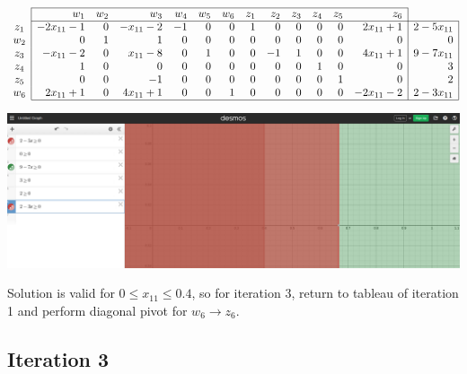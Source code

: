\documentclass[12pt]{article}
\begin{document}
$\begin{array}{c|rrrrrrrrrrrr|r|}
\cline{2-13}
& w_1 & w_2 & w_3 & w_4 & w_5 & w_6 & z_1 & z_2 & z_3 & z_4 & z_5 & z_6 \\
\cline{2-14}
z_1 & - 2 x_{11} - 1 & 0 & - x_{11} - 2 & -1 & 0 & 0 & 1 & 0 & 0 & 0 & 0 & 2 x_{11} + 1 & 2 - 5 x_{11} \\
w_2 & 0 & 1 & 1 & 0 & 0 & 0 & 0 & 0 & 0 & 0 & 0 & 0 & 0 \\
z_3 & - x_{11} - 2 & 0 & x_{11} - 8 & 0 & 1 & 0 & 0 & -1 & 1 & 0 & 0 & 4 x_{11} + 1 & 9 - 7 x_{11} \\
z_4 & 1 & 0 & 0 & 0 & 0 & 0 & 0 & 0 & 0 & 1 & 0 & 0 & 3 \\
z_5 & 0 & 0 & -1 & 0 & 0 & 0 & 0 & 0 & 0 & 0 & 1 & 0 & 2 \\
w_6 & 2 x_{11} + 1 & 0 & 4 x_{11} + 1 & 0 & 0 & 1 & 0 & 0 & 0 & 0 & 0 & - 2 x_{11} - 2 & 2 - 3 x_{11} \\
\cline{2-14}
\end{array}$

\begin{center}
\includegraphics[scale=.3]{Phase2_iteration2_visual}
\end{center}

Solution is valid for $0 \leq x_{11} \leq 0.4$, so for iteration 3, return to tableau of iteration 1 and perform diagonal pivot for $w_6 \rightarrow z_6$.


\subsection*{Iteration 3}
\end{document}
